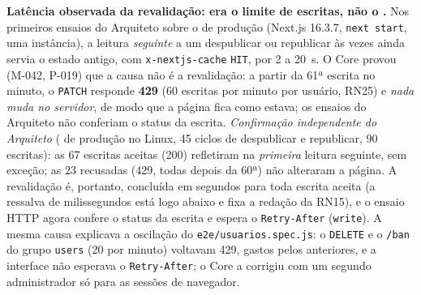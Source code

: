 \textbf{Latência observada da revalidação: era o limite de escritas, não o .} Nos primeiros ensaios do Arquiteto sobre o  de produção (Next.js 16.3.7, \texttt{next start}, uma instância), a leitura \emph{seguinte} a um despublicar ou republicar às vezes ainda servia o estado antigo, com \texttt{x-nextjs-cache} \texttt{HIT}, por 2 a 20~s. O Core provou (M-042, P-019) que a causa não é a revalidação: a partir da 61ª escrita no minuto, o \texttt{PATCH} responde \textbf{429} (60 escritas por minuto por usuário, RN25) e \emph{nada muda no servidor}, de modo que a página fica como estava; os ensaios do Arquiteto não conferiam o status da escrita. \emph{Confirmação independente do Arquiteto} ( de produção no Linux, 45 ciclos de despublicar e republicar, 90 escritas): as 67 escritas aceitas (200) refletiram na \emph{primeira} leitura seguinte, sem exceção; as 23 recusadas (429, todas depois da 60ª) não alteraram a página. A revalidação é, portanto, concluída em segundos para toda escrita aceita (a ressalva de milissegundos está logo abaixo e fixa a redação da RN15), e o ensaio HTTP agora confere o status da escrita e espera o \texttt{Retry-After} (\texttt{write}). A mesma causa explicava a oscilação do \texttt{e2e/usuarios.spec.js}: o \texttt{DELETE} e o \texttt{/ban} do grupo \texttt{users} (20 por minuto) voltavam 429, gastos pelos  anteriores, e a interface não esperava o \texttt{Retry-After}; o Core a corrigiu com um segundo administrador só para as sessões de navegador.

